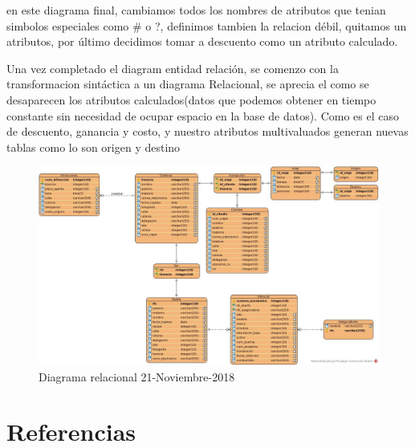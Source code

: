 \documentclass{article}
\begin{document}
en este diagrama final, cambiamos todos los nombres de atributos que tenian simbolos especiales como \# o ?, definimos tambien la relacion débil,  quitamos un atributos, por último decidimos tomar a descuento como un atributo calculado.\\


Una vez completado el diagram entidad relación, se comenzo con la transformacion sintáctica a un diagrama Relacional, se aprecia el como se desaparecen los atributos calculados(datos que podemos obtener en tiempo constante sin necesidad de ocupar espacio en la base de datos). Como es el caso de descuento, ganancia y costo, y nuestro atributos multivaluados generan nuevas tablas como lo son origen y destino\\

\begin{figure}[H]
\begin{center}
\includegraphics[width=5in]{./img/relacional.jpg}
\caption{Diagrama relacional 21-Noviembre-2018}
\end{center}
\end{figure}



\section{Referencias}
\end{document}
